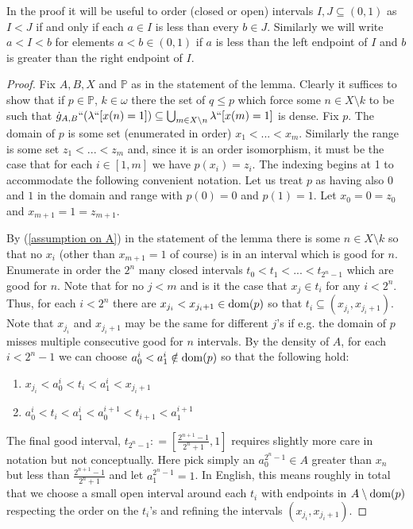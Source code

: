 \documentclass[leqno,11pt]{amsart}
\theoremstyle{definition}
\theoremstyle{remark}
\def\P{\mathbb P}
\begin{document}
In the proof it will be useful to order (closed or open) intervals $I, J \subseteq (0, 1)$ as $I < J$ if and only if each $a \in I$ is less than every $b \in J$. Similarly we will write $a < I < b$ for elements $a < b \in (0, 1)$ if $a$ is less than the left endpoint of $I$ and $b$ is greater than the right endpoint of $I$. 

\begin{proof}
    Fix $A, B, X$ and $\P$ as in the statement of the lemma. Clearly it suffices to show that if $p \in \P$, $k \in \omega$ there the set of $q \leq p$ which force some $n \in X \setminus k$ to be such that $\dot{g}_{A, B} ``(\lambda``[x(n) = 1]) \subseteq \bigcup_{m \in X \setminus n} \lambda ``[x(m) = 1]$ is dense. Fix $p$. The domain of $p$ is some set (enumerated in order) $x_1 < ... < x_m$. Similarly the range is some set $z_1 < ... < z_m$ and, since it is an order isomorphism, it must be the case that for each $i \in [1, m]$ we have $p(x_i) = z_i$. The indexing begins at 1 to accommodate the following convenient notation. Let us treat $p$ as having also $0$ and $1$ in the domain and range with $p(0) = 0$ and $p(1) = 1$. Let $x_0 = 0 = z_0$ and $x_{m+1} = 1 = z_{m+1}$. 

    By (\ref{assumption on A}) in the statement of the lemma there is some $n \in X \setminus k$ so that no $x_i$ (other than $x_{m+1} = 1$ of course) is in an interval which is good for $n$. Enumerate in order the $2^{n}$ many closed intervals $t_0 < t_1 < ... < t_{2^{n}-1}$ which are good for $n$. Note that for no $j< m$ and is it the case that $x_j \in t_i$ for any $i < 2^n$. Thus, for each $i < 2^{n}$ there are $x_{j_i} < x_{j_i+1} \in {\rm dom}(p)$ so that $t_i \subseteq (x_{j_i}, x_{j_i + 1})$. Note that $x_{j_i}$ and $x_{j_{i}+1}$ may be the same for different $j$'s if e.g. the domain of $p$ misses multiple consecutive good for $n$ intervals. By the density of $A$, for each $i < 2^n - 1$ we can choose $a_0^i < a_1^i \notin {\rm dom}(p)$ so that the following hold:
    \begin{enumerate}
        \item $x_{j_i}< a^i_0 < t_i <  a^i_1 < x_{j_{i}+1}$
        \item $a^i_0 < t_i < a^i_1 < a^{i+1}_0 < t_{i+1} < a^{i+1}_1$
    \end{enumerate}
    The final good interval, $t_{2^n -1} : = [\frac{2^{n+1}-1}{2^n+1} , 1]$ requires slightly more care in notation but not conceptually. Here pick simply an $a^{2^n-1}_0 \in A$ greater than $x_n$ but less than $\frac{2^{n+1}-1}{2^n+1}$ and let $a^{2^n-1}_1 = 1$. In English, this means roughly in total that we choose a small open interval around each $t_i$ with endpoints in $A \setminus {\rm dom}(p)$ respecting the order on the $t_i$'s and refining the intervals $(x_{j_i}, x_{j_i + 1})$. 


\end{proof}
\end{document}
